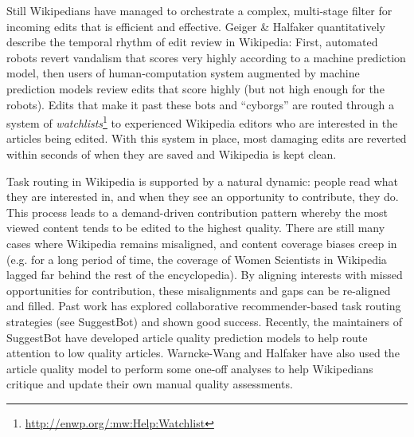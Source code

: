 Still Wikipedians have managed to orchestrate a complex, multi-stage filter for incoming edits that is efficient and effective.  Geiger \& Halfaker quantitatively describe the temporal rhythm of edit review in Wikipedia\cite{geiger2013levee}: First, automated robots revert vandalism that scores very highly according to a machine prediction model, then users of human-computation system augmented by machine prediction models review edits that score highly (but not high enough for the robots).  Edits that make it past these bots and ``cyborgs''\cite{halfaker2012bots} are routed through a system of \emph{watchlists}\footnote{\url{http://enwp.org/:mw:Help:Watchlist}} to experienced Wikipedia editors who are interested in the articles being edited.  With this system in place, most damaging edits are reverted within seconds of when they are saved\cite{geiger2013levee} and Wikipedia is kept clean.

 Task routing in Wikipedia is supported by a natural dynamic: people read what they are interested in, and when they see an opportunity to contribute, they do.  This process leads to a demand-driven contribution pattern whereby the most viewed content tends to be edited to the highest quality\cite{hill2014consider}.  There are still many cases where Wikipedia remains misaligned\cite{wang2015misalignment}, and content coverage biases creep in (e.g. for a long period of time, the coverage of Women Scientists in Wikipedia lagged far behind the rest of the encyclopedia\cite{halfaker2017interpolating}).  By aligning interests with missed opportunities for contribution, these misalignments and gaps can be re-aligned and filled.  Past work has explored collaborative recommender-based task routing strategies (see SuggestBot\cite{cosley2007suggestbot}) and shown good success.  Recently, the maintainers of SuggestBot have developed article quality prediction models to help route attention to low quality articles\cite{wang2013tell}.  Warncke-Wang and Halfaker have also used the article quality model to perform some one-off analyses to help Wikipedians critique and update their own manual quality assessments\cite{wang2014screening}.

